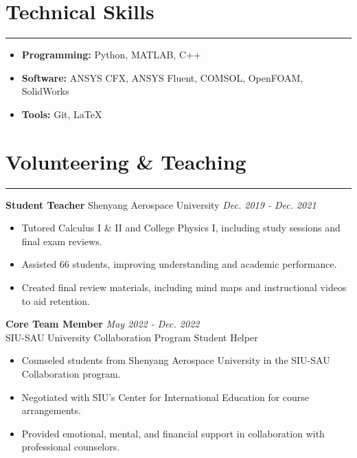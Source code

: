 \documentclass[10pt]{article} %
\begin{document}

\section*{Technical Skills}
\hrule
\begin{itemize}[leftmargin=*,itemsep=1pt]
    \item \textbf{Programming:}  Python, MATLAB, C++
    \item \textbf{Software:} ANSYS CFX, ANSYS Fluent, COMSOL, OpenFOAM, SolidWorks
    \item \textbf{Tools:} Git, LaTeX
\end{itemize}


\section*{Volunteering \& Teaching}
\hrule

\noindent \textbf{Student Teacher}  Shenyang Aerospace University  \hfill \textit{Dec. 2019 - Dec. 2021} \\
\vspace{-6mm}
\begin{itemize}[leftmargin=*,itemsep=1pt] 
    \item Tutored Calculus I \& II and College Physics I, including study sessions and final exam reviews.
    \item Assisted 66 students, improving understanding and academic performance.
    \item Created final review materials, including mind maps and instructional videos to aid retention.
\end{itemize}

\noindent\textbf{Core Team Member} \hfill \textit{May 2022 - Dec. 2022} \\
SIU-SAU University Collaboration Program Student Helper
\begin{itemize}[leftmargin=*,itemsep=1pt]
    \item Counseled students from Shenyang Aerospace University in the SIU-SAU Collaboration program.
    \item Negotiated with SIU's Center for International Education for course arrangements.
    \item Provided emotional, mental, and financial support in collaboration with professional counselors.
\end{itemize}

\vspace{2mm} 
\end{document}
